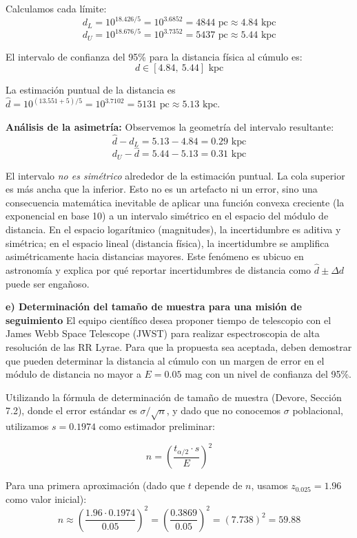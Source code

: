 Calculamos cada límite:
$$ d_L = 10^{18.426/5} = 10^{3.6852} = 4844 \text{ pc} \approx 4.84 \text{ kpc} $$
$$ d_U = 10^{18.676/5} = 10^{3.7352} = 5437 \text{ pc} \approx 5.44 \text{ kpc} $$

El intervalo de confianza del 95\% para la distancia física al cúmulo es:
$$ d \in [4.84, \ 5.44] \text{ kpc} $$

La estimación puntual de la distancia es $\hat{d} = 10^{(13.551+5)/5} = 10^{3.7102} = 5131 \text{ pc} \approx 5.13 \text{ kpc}$.

\textbf{Análisis de la asimetría:}
Observemos la geometría del intervalo resultante:
$$ \hat{d} - d_L = 5.13 - 4.84 = 0.29 \text{ kpc} $$
$$ d_U - \hat{d} = 5.44 - 5.13 = 0.31 \text{ kpc} $$

El intervalo \textit{no es simétrico} alrededor de la estimación puntual. La cola superior es más ancha que la inferior. Esto no es un artefacto ni un error, sino una consecuencia matemática inevitable de aplicar una función convexa creciente (la exponencial en base 10) a un intervalo simétrico en el espacio del módulo de distancia. En el espacio logarítmico (magnitudes), la incertidumbre es aditiva y simétrica; en el espacio lineal (distancia física), la incertidumbre se amplifica asimétricamente hacia distancias mayores. Este fenómeno es ubicuo en astronomía y explica por qué reportar incertidumbres de distancia como $\hat{d} \pm \Delta d$ puede ser engañoso.

\textbf{e) Determinación del tamaño de muestra para una misión de seguimiento}
El equipo científico desea proponer tiempo de telescopio con el James Webb Space Telescope (JWST) para realizar espectroscopia de alta resolución de las RR Lyrae. Para que la propuesta sea aceptada, deben demostrar que pueden determinar la distancia al cúmulo con un margen de error en el módulo de distancia no mayor a $E = 0.05$ mag con un nivel de confianza del 95\%.

Utilizando la fórmula de determinación de tamaño de muestra (Devore, Sección 7.2), donde el error estándar es $\sigma / \sqrt{n}$, y dado que no conocemos $\sigma$ poblacional, utilizamos $s = 0.1974$ como estimador preliminar:

$$ n = \left( \frac{t_{\alpha/2} \cdot s}{E} \right)^2 $$

Para una primera aproximación (dado que $t$ depende de $n$, usamos $z_{0.025} = 1.96$ como valor inicial):
$$ n \approx \left( \frac{1.96 \cdot 0.1974}{0.05} \right)^2 = \left( \frac{0.3869}{0.05} \right)^2 = (7.738)^2 = 59.88 $$

